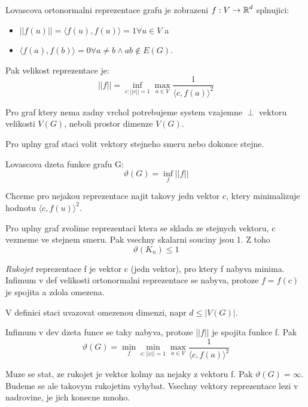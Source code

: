 \begin{definition}
	Lovascova ortonormalni reprezentace grafu je zobrazeni $f:V \to \operatorname{\mathbb{R}}^d$ splnujici:
	\begin{itemize}
		\item $|| f(u) || = \langle f(u), f(u) \rangle = 1 \forall u \in V$ a
		\item $\langle f(a), f(b) \rangle = 0 \forall a \ne b \land ab \notin E(G)$.
	\end{itemize}

	Pak velikost reprezentace je:
	\[ || f || = \inf_{c: ||c|| = 1} \max_{a \in V} \frac{1}{\langle c, f(a) \rangle^2} \]
\end{definition}

\begin{example}
	Pro graf ktery nema zadny vrchol potrebujeme system vzajemne $\perp$ vektoru velikosti $V(G)$, neboli prostor dimenze $V(G)$.

	Pro uplny graf staci volit vektory stejneho smeru nebo dokonce stejne.
\end{example}

\begin{definition}
	Lovascova dzeta funkce grafu G:
	\[ \vartheta(G) = \inf_f || f || \]

	Chceme pro nejakou reprezentace najit takovy jedn vektor c, ktery minimalizuje hodnotu $\langle c, f(u) \rangle^2$.
\end{definition}

\begin{example}
	Pro uplny graf zvolime reprezentaci ktera se sklada ze stejnych vektoru, c vezmeme ve stejnem smeru.
	Pak vsechny skalarni souciny jsou 1. Z toho
	\[ \vartheta(K_n) \leq 1 \]
\end{example}

\begin{definition}
	\emph{Rukojet} reprezentace f je vektor c (jedn vektor), pro ktery f nabyva minima.
	Infimum v def velikosti ortonormalni reprezentace se nabyva, protoze $f = f(c)$ je spojita a zdola omezena.

	V definici staci uvazovat omezenou dimenzi, napr $d \leq |V(G)|$.

	Infimum v dev dzeta funce se taky nabyva, protoze $||f||$ je spojita funkce f. Pak
	\[ \vartheta(G) = \min_f \min_{c: ||c|| = 1} \max_{a \in V} \frac{1}{\langle c, f(a) \rangle^2} \]
\end{definition}
\begin{agreement}
	Muze se stat, ze rukojet je vektor kolmy na nejaky z vektoru f. Pak $\vartheta(G) = \infty$.
	Budeme se ale takovym rukojetim vyhybat. Vsechny vektory reprezentace lezi v nadrovine, je jich konecne mnoho.
\end{agreement}

